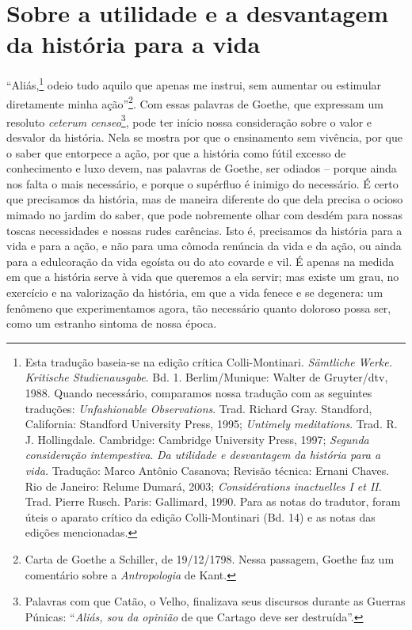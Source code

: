 
\part{Sobre a utilidade e a desvantagem da história para a vida}



\label{prefuxe1cio}

``Aliás,\footnote{Esta tradução baseia-se na edição crítica
  Colli-Montinari. \emph{Sämtliche Werke. Kritische Studienausgabe}. Bd.
  1. Berlim/Munique: Walter de Gruyter/dtv, 1988. Quando necessário,
  comparamos nossa tradução com as seguintes traduções:
  \emph{Unfashionable Observations}. Trad. Richard Gray. Standford,
  California: Standford University Press, 1995; \emph{Untimely
  meditations}. Trad. R. J. Hollingdale. Cambridge: Cambridge University
  Press, 1997; \emph{Segunda consideração intempestiva}. \emph{Da
  utilidade e desvantagem da história para a vida.} Tradução: Marco
  Antônio Casanova; Revisão técnica: Ernani Chaves. Rio de Janeiro:
  Relume Dumará, 2003; \emph{Considérations inactuelles I et II}. Trad.
  Pierre Rusch. Paris: Gallimard, 1990. Para as notas do tradutor, foram
  úteis o aparato crítico da edição Colli-Montinari (Bd. 14) e as notas
  das edições mencionadas.} odeio tudo aquilo que apenas me instrui, sem
aumentar ou estimular diretamente minha ação''\footnote{Carta de Goethe
  a Schiller, de 19/12/1798. Nessa passagem, Goethe faz um comentário
  sobre a \emph{Antropologia} de Kant.}. Com essas palavras de Goethe,
que expressam um resoluto \emph{ceterum censeo}\footnote{Palavras com
  que Catão, o Velho, finalizava seus discursos durante as Guerras
  Púnicas: ``\emph{Aliás, sou da opinião} de que Cartago deve ser
  destruída''.}, pode ter início nossa consideração sobre o valor e
desvalor da história. Nela se mostra por que o ensinamento sem vivência,
por que o saber que entorpece a ação, por que a história como fútil
excesso de conhecimento e luxo devem, nas palavras de Goethe, ser odiados
-- porque ainda nos falta o mais necessário, e porque o supérfluo é
inimigo do necessário. É certo que precisamos da história, mas de
maneira diferente do que dela precisa o ocioso mimado no jardim do
saber, que pode nobremente olhar com desdém para nossas toscas
necessidades e nossas rudes carências. Isto é, precisamos da história
para a vida e para a ação, e não para uma cômoda renúncia da vida e da
ação, ou ainda para a edulcoração da vida egoísta ou do ato covarde e
vil. É apenas na medida em que a história serve à vida que queremos a
ela servir; mas existe um grau, no exercício e na valorização da história,
em que a vida fenece e se degenera: um fenômeno que experimentamos
agora, tão necessário quanto doloroso possa ser, como um estranho
sintoma de nossa época.\label{sintomadenossaepoca}

